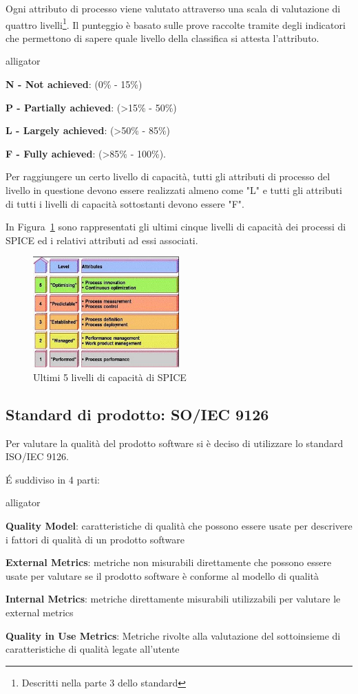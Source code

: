 Ogni attributo di processo viene valutato attraverso una scala di valutazione di quattro livelli\footnote{Descritti nella parte 3 dello standard}. Il punteggio è basato sulle prove raccolte tramite degli indicatori che permettono di sapere quale livello della classifica si attesta l'attributo. 
\begin{labeling}{alligator}
	\item \textbf{N - Not achieved}: (0\% - 15\%)
	\item \textbf{P - Partially achieved}: (>15\% - 50\%)
	\item \textbf{L - Largely achieved}: (>50\% - 85\%)
	\item \textbf{F - Fully achieved}: (>85\% - 100\%).
\end{labeling}

Per raggiungere un certo livello di capacità, tutti gli attributi di processo del livello in questione devono essere realizzati almeno come "L" e tutti gli attributi di tutti i livelli di capacità sottostanti devono essere "F".

In Figura~\ref{fig:liv_cap_spice} sono rappresentati gli ultimi cinque livelli di capacità dei processi di SPICE ed i relativi attributi ad essi associati.

\begin{figure}[h!]
	\centering
	\includegraphics[width=0.50\textwidth]{img/liv_cap_spice.jpg}
	\caption{Ultimi 5 livelli di capacità di SPICE}
	\label{fig:liv_cap_spice}
\end{figure}


\subsection{Standard di prodotto: SO/IEC 9126}
\label{AppA:standardProd}
Per valutare la qualità del prodotto software si è deciso di utilizzare lo standard ISO/IEC 9126.


É suddiviso in 4 parti:
\begin{labeling}{alligator}
	\item \textbf{Quality Model}: caratteristiche di qualità che possono essere usate per descrivere i fattori di qualità di un prodotto software
	\item \textbf{External Metrics}: metriche non misurabili direttamente che possono essere usate per valutare se il prodotto software è conforme al modello di qualità
	\item \textbf{Internal Metrics}: metriche direttamente misurabili utilizzabili per valutare le external metrics
	\item \textbf{Quality in Use Metrics}: Metriche rivolte alla valutazione del sottoinsieme di caratteristiche di qualità legate all’utente
\end{labeling}

